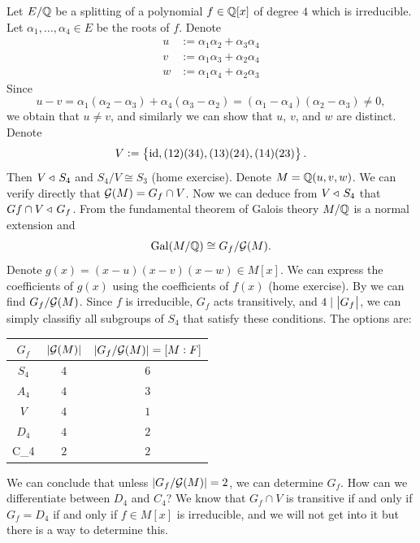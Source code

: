 \documentclass[11pt,a4paper]{article}
\begin{document}
\begin{example}
  Let $E/\mathbb{Q}$ be a splitting of a polynomial $f \in \mathbb{Q}[x]$
  of degree $4$ which is irreducible.
  Let $\alpha_1,\dots,\alpha_4 \in E$ be the roots of $f$.
  Denote
  \begin{align*}
    u &:= \alpha_1 \alpha_2 + \alpha_3 \alpha_4 \\
    v &:= \alpha_1 \alpha_3 + \alpha_2 \alpha_4 \\
    w &:= \alpha_1 \alpha_4 + \alpha_2 \alpha _3
  \end{align*}
  Since
  \[
    u - v = \alpha_1 (\alpha_2 - \alpha_3) + \alpha_4 (\alpha_3 - \alpha_2) =
    (\alpha_1 - \alpha_4) (\alpha_2 - \alpha_3) \neq 0,
  \]
  we obtain that $u \neq v$,
  and similarly we can show that $u$, $v$, and $w$ are distinct.
  Denote
  \[
    V := \left\{\operatorname{id}, (12)(34), (13)(24), (14)(23)\right\}.
  \]
  Then $V \triangleleft\, S_4$ and $S_4/V \cong S_3$ (home exercise).
  Denote $M = \mathbb{Q}(u,v,w)$.
  We can verify directly that $\mathcal G(M) = G_f \cap V$.
  Now we can deduce from
  $V \triangleleft\, S_4$ that $G f \cap V \triangleleft\, G_f$.
  From the fundamental theorem
  of Galois theory $M/\mathbb{Q}$ is a normal extension and
  \[
    \operatorname{Gal}(M/\mathbb{Q}) \cong G_f / \mathcal G(M).
  \]
  Denote $g(x) = (x - u)(x - v)(x - w) \in M[x]$.
  We can express the coefficients of $g(x)$ using the coefficients of $f(x)$
  (home exercise).
  By 
  we can find $G_f / \mathcal G(M)$.
  Since $f$ is irreducible, $G_f$ acts transitively,
  and $4 \mid \left\lvert G_f\right\rvert$,
  we can simply classifiy all subgroups of $S_4$
  that satisfy these conditions.
  The options are:
  \begin{center}
    \begin{tabular}{c|c|c}
    $G_f$ & $|\mathcal G(M)|$ & $|G_f/\mathcal G(M)| = [M : F]$ \\ \hline
    $S_4$ & $4$            & $6$                          \\ \hline
    $A_4$ & $4$            & $3$                          \\ \hline
    $V$   & $4$            & $1$                          \\ \hline
    $D_4$ & $4$            & $2$                          \\ \hline
    C\_4  & $2$            & $2$                          \\
    \end{tabular}
  \end{center}
  We can conclude that unless $|G_f/\mathcal G(M)| = 2$,
  we can determine $G_f$.
  How can we differentiate between $D_4$ and $C_4$?
  We know that $G_f \cap V$ is transitive if and only if $G_f = D_4$
  if and only if $f \in M[x]$ is irreducible,
  and we will not get into it but there is a way to determine this.
\end{example}
\end{document}
